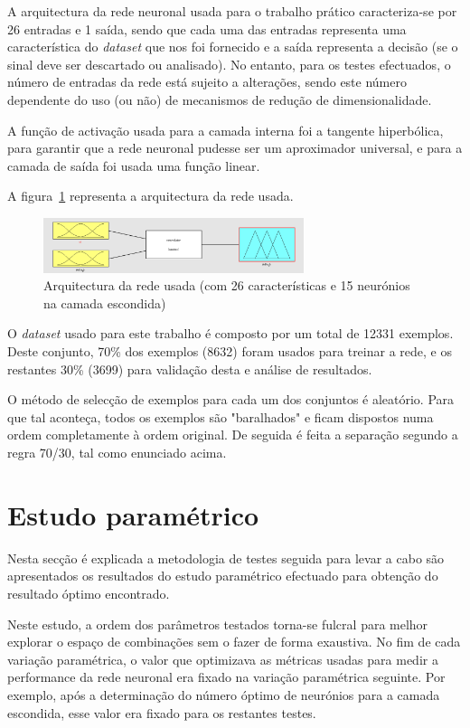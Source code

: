\documentclass{article}
\begin{document}
A arquitectura da rede neuronal usada para o trabalho prático caracteriza-se por 26 entradas e 1 saída, sendo que cada uma das entradas representa uma característica do \textit{dataset} que nos foi fornecido e a saída representa a decisão (se o sinal deve ser descartado ou analisado). No entanto, para os testes efectuados, o número de entradas da rede está sujeito a alterações, sendo este número dependente do uso (ou não) de mecanismos de redução de dimensionalidade.

A função de activação usada para a camada interna foi a tangente hiperbólica, para garantir que a rede neuronal pudesse ser um aproximador universal, e para a camada de saída foi usada uma função linear.

A figura~\ref{nn_architecture} representa a arquitectura da rede usada.

\begin{figure}[!h]
  \centering
  \includegraphics[width=3in]{figures/nn_architecture}
  \caption{Arquitectura da rede usada (com 26 características e 15 neurónios na camada escondida)}
  \label{nn_architecture}
\end{figure}

O \textit{dataset} usado para este trabalho é composto por um total de 12331 exemplos. Deste conjunto, 70\% dos exemplos (8632) foram usados para treinar a rede, e os restantes 30\% (3699) para validação desta e análise de resultados.

O método de selecção de exemplos para cada um dos conjuntos é aleatório. Para que tal aconteça, todos os exemplos são "baralhados" e ficam dispostos numa ordem completamente à ordem original. De seguida é feita a separação segundo a regra 70/30, tal como enunciado acima.

\clearpage
\section{Estudo paramétrico}
\indent \indent Nesta secção é explicada a metodologia de testes seguida para levar a cabo são apresentados os resultados do estudo paramétrico efectuado para obtenção do resultado óptimo encontrado.

Neste estudo, a ordem dos parâmetros testados torna-se fulcral para melhor explorar o espaço de combinações sem o fazer de forma exaustiva. No fim de cada variação paramétrica, o valor que optimizava as métricas usadas para medir a performance da rede neuronal era fixado na variação paramétrica seguinte. Por exemplo, após a determinação do número óptimo de neurónios para a camada escondida, esse valor era fixado para os restantes testes.
\end{document}
